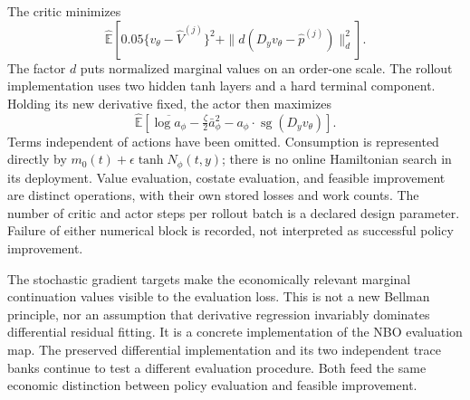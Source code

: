\documentclass[ecta,nameyear,draft]{econsocart}
\theoremstyle{definition}
\theoremstyle{remark}
\newcommand{\E}{\mathbb E}
\begin{document}
The critic minimizes
\begin{equation}\label{eq:r11critic}
 \widehat{\E}\left[
  0.05\{v_\theta-\widehat V^{(j)}\}^2+
  \|d(D_yv_\theta-\widehat p^{(j)})\|_d^2\right].
\end{equation}
The factor $d$ puts normalized marginal values on an order-one scale. The rollout implementation uses two hidden tanh layers and a hard terminal component. Holding its new derivative fixed, the actor then maximizes
\begin{equation}\label{eq:r11actor}
 \widehat{\E}\left[
 \overline{\log a_\phi}-\tfrac\zeta2\bar a_\phi^2
                          -a_\phi\mathbin{\cdot}\operatorname{sg}(D_yv_\theta)\right].
\end{equation}
Terms independent of actions have been omitted. Consumption is represented directly by $m_0(t)+\epsilon\tanh N_\phi(t,y)$; there is no online Hamiltonian search in its deployment. Value evaluation, costate evaluation, and feasible improvement are distinct operations, with their own stored losses and work counts. The number of critic and actor steps per rollout batch is a declared design parameter. Failure of either numerical block is recorded, not interpreted as successful policy improvement.

The stochastic gradient targets make the economically relevant marginal continuation values visible to the evaluation loss. This is not a new Bellman principle, nor an assumption that derivative regression invariably dominates differential residual fitting. It is a concrete implementation of the NBO evaluation map. The preserved differential implementation and its two independent trace banks continue to test a different evaluation procedure. Both feed the same economic distinction between policy evaluation and feasible improvement.

\end{document}
